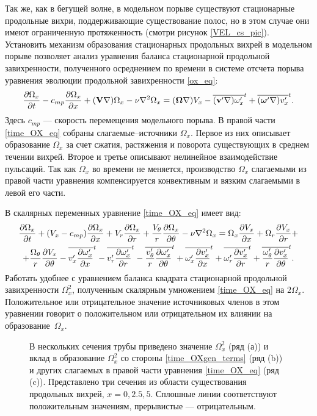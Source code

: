 Так же, как в бегущей волне, в модельном порыве существуют стационарные продольные  вихри, поддерживающие существование полос, но в этом случае они имеют ограниченную протяженность (смотри рисунок \ref{VEL_cs_pic}). Установить механизм образования стационарных продольных вихрей в модельном порыве позволяет анализ уравнения баланса стационарной продольной завихренности, полученного осреднением по времени в системе отсчета порыва уравнения эволюции продольной завихренности \eqref{ox_eq}: 
\begin{equation} \label{time_OX_eq}
\frac{\partial \Omega_x}{\partial t} - c_{mp} \frac{\partial \Omega_x}{\partial x} + (\mathbf{V}\nabla) \Omega_x - \nu\nabla^2 \Omega_x = (\mbox{\boldmath$\Omega$}\nabla) V_x - \overline{(\mathbf{v}'\nabla) \omega'_x}^t + \overline{(\mbox{\boldmath$\omega$}'\nabla) v'_x}^t.
\end{equation}
Здесь $c_{mp}$ --- скорость перемещения модельного порыва. В правой части \eqref{time_OX_eq} собраны слагаемые--источники $\Omega_x$. Первое из них описывает образование $\Omega_x$ за счет сжатия, растяжения и поворота существующих в среднем течении вихрей. Второе и третье описывают нелинейное взаимодействие пульсаций. Так как $\Omega_x$ во времени не меняется, производство $\Omega_x$ слагаемыми из правой части уравнения компенсируется конвективным и вязким слагаемыми в левой его части. 

В скалярных переменных уравнение \eqref{time_OX_eq} имеет вид:
\begin{multline}\label{time_OX1_eq}
\frac{\partial \Omega_x}{\partial t} + (V_x - c_{mp})\frac{\partial \Omega_x}{\partial x} + V_r \frac{\partial \Omega_x}{\partial r} + \frac{V_\theta}{r} \frac{\partial \Omega_x}{\partial \theta} - \nu\nabla^2\Omega_x= \Omega_x \frac{\partial V_x}{\partial x} + \Omega_r \frac{\partial V_x}{\partial r} + \\ + \frac{\Omega_\theta}{r} \frac{\partial V_x}{\partial \theta}
 - \overline{v'_x \frac{\partial \omega'_x}{\partial x}}^t - \overline{v'_r \frac{\partial \omega'_x}{\partial r}}^t - \overline{\frac{v'_\theta}{r} \frac{\partial \omega'_x}{\partial \theta}}^t
 + \overline{\omega'_x \frac{\partial v'_x}{\partial x}}^t + \overline{\omega'_r \frac{\partial v'_x}{\partial r}}^t + \overline{\frac{\omega'_\theta}{r} \frac{\partial v'_x}{\partial \theta}}^t.
\end{multline}
Работать удобнее с уравнением баланса квадрата стационарной продольной завихренности $\Omega_x^2$, полученным скалярным умножением \eqref{time_OX_eq} на $2\Omega_x$. Положительное или отрицательное значение источниковых членов в этом уравнении говорит о положительном или отрицательном их влиянии на образование~$\Omega_x$. 


\begin{figure}[h]
\caption{В нескольких сечения трубы приведено значение $\Omega_x^2$ (ряд (а)) и вклад в образование $\Omega_x^2$ со стороны \eqref{time_OXgen_terms} (ряд (b)) и других слагаемых в правой части уравнения \eqref{time_OX_eq} (ряд (c)). Представлено три сечения из области существования продольных вихрей, $x=0,2.5,5$. Сплошные линии соответствуют положительным значениям, прерывистые --- отрицательным.}
\label{mp_OXgen_pic}
\end{figure}

